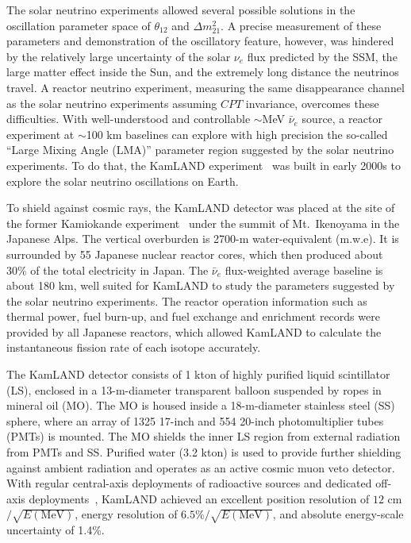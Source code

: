 \documentclass[aps,twocolumn,preprintnumbers,amsmath,superscriptaddress,amssymb,floats,nofootinbib]{revtex4-1}
\begin{document}
The solar neutrino experiments allowed several possible solutions in the oscillation parameter space of $\theta_{12}$ and $\Delta m^2_{21}$.
A precise measurement of these parameters and demonstration of the oscillatory feature, however, was hindered by the relatively large uncertainty of the solar $\nu_{e}$ flux predicted by the SSM, the large matter effect inside the Sun, and the extremely long distance the neutrinos travel.
A reactor neutrino experiment, measuring the same disappearance channel as the solar neutrino experiments assuming $CPT$ invariance, overcomes these difficulties.
With well-understood and controllable $\sim$MeV $\bar\nu_e$ source, a reactor experiment at $\sim$100 km baselines can explore with high precision the so-called ``Large Mixing Angle (LMA)'' parameter region suggested by the solar neutrino experiments. To do that, the KamLAND experiment~\cite{Kamland03} was built in early 2000s to explore the solar neutrino oscillations on Earth.

To shield against cosmic rays, the KamLAND detector was placed at the site of the former Kamiokande experiment~\cite{Kamiokande} under the summit of Mt.~Ikenoyama in the Japanese Alps.
The vertical overburden is 2700-m water-equivalent (m.w.e).
It is surrounded by 55 Japanese nuclear reactor cores, which then produced about 30\% of the total electricity in Japan.
The $\bar\nu_e$ flux-weighted average baseline is about 180 km, well suited for KamLAND to study the parameters suggested by the solar neutrino experiments.
The reactor operation information such as thermal power, fuel burn-up, and fuel exchange and enrichment records were provided by all Japanese reactors, which allowed KamLAND to calculate the instantaneous fission rate of each isotope accurately.

The KamLAND detector consists of 1 kton of highly purified liquid scintillator (LS), enclosed in a 13-m-diameter transparent balloon suspended by ropes in mineral oil (MO).
The MO is housed inside a 18-m-diameter stainless steel (SS) sphere, where an array of 1325 17-inch and 554 20-inch photomultiplier tubes (PMTs) is mounted.
The MO shields the inner LS region from external radiation from PMTs and SS.
Purified water (3.2 kton) is used to provide further shielding against ambient radiation and operates as an active cosmic muon veto detector.
With regular central-axis deployments of radioactive sources and dedicated off-axis deployments~\cite{KamLAND-4pi}, KamLAND achieved an excellent position resolution of $12$ cm$/\sqrt{E(\textrm{MeV})}$, energy resolution of $6.5\%/\sqrt{E(\textrm{MeV})}$, and absolute energy-scale uncertainty of 1.4\%.
\end{document}
